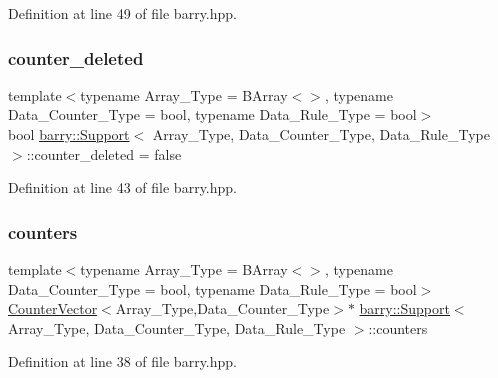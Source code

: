 Definition at line 49 of file barry.\+hpp.

\mbox{\label{classbarry_1_1_support_a5de08029a7262ba86df728c8b8427999}} 
\subsubsection{\texorpdfstring{counter\+\_\+deleted}{counter\_deleted}}
{\footnotesize\ttfamily template$<$typename Array\+\_\+\+Type = B\+Array$<$$>$, typename Data\+\_\+\+Counter\+\_\+\+Type = bool, typename Data\+\_\+\+Rule\+\_\+\+Type = bool$>$ \\
bool \hyperlink{classbarry_1_1_support}{barry\+::\+Support}$<$ Array\+\_\+\+Type, Data\+\_\+\+Counter\+\_\+\+Type, Data\+\_\+\+Rule\+\_\+\+Type $>$\+::counter\+\_\+deleted = false}



Definition at line 43 of file barry.\+hpp.

\mbox{\label{classbarry_1_1_support_ab1d697b1f970b160db6d5f76d602bb3c}} 
\subsubsection{\texorpdfstring{counters}{counters}}
{\footnotesize\ttfamily template$<$typename Array\+\_\+\+Type = B\+Array$<$$>$, typename Data\+\_\+\+Counter\+\_\+\+Type = bool, typename Data\+\_\+\+Rule\+\_\+\+Type = bool$>$ \\
\hyperlink{classbarry_1_1_counter_vector}{Counter\+Vector}$<$Array\+\_\+\+Type,Data\+\_\+\+Counter\+\_\+\+Type$>$$\ast$ \hyperlink{classbarry_1_1_support}{barry\+::\+Support}$<$ Array\+\_\+\+Type, Data\+\_\+\+Counter\+\_\+\+Type, Data\+\_\+\+Rule\+\_\+\+Type $>$\+::counters}



Definition at line 38 of file barry.\+hpp.

\mbox{\label{classbarry_1_1_support_aa69d5a47e5ee039b19f42edacd5453d4}} 
